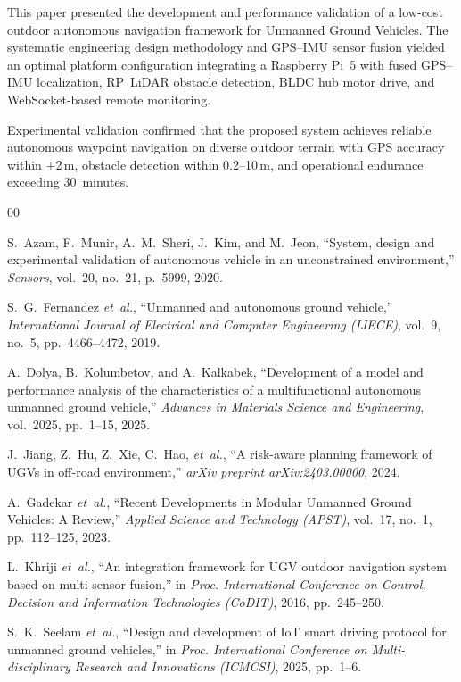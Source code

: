 \documentclass[conference]{IEEEtran}
\begin{document}
This paper presented the development and performance validation of a low-cost outdoor autonomous navigation framework for Unmanned Ground Vehicles. The systematic engineering design methodology and GPS--IMU sensor fusion yielded an optimal platform configuration integrating a Raspberry Pi~5 with fused GPS--IMU localization, RP~LiDAR obstacle detection, BLDC hub motor drive, and WebSocket-based remote monitoring.

Experimental validation confirmed that the proposed system achieves reliable autonomous waypoint navigation on diverse outdoor terrain with GPS accuracy within $\pm$2\,m, obstacle detection within 0.2--10\,m, and operational endurance exceeding 30~minutes.

\begin{thebibliography}{00}

S.~Azam, F.~Munir, A.~M.~Sheri, J.~Kim, and M.~Jeon, ``System, design and experimental validation of autonomous vehicle in an unconstrained environment,'' \textit{Sensors}, vol.~20, no.~21, p.~5999, 2020.

S.~G.~Fernandez \textit{et~al.}, ``Unmanned and autonomous ground vehicle,'' \textit{International Journal of Electrical and Computer Engineering (IJECE)}, vol.~9, no.~5, pp.~4466--4472, 2019.

A.~Dolya, B.~Kolumbetov, and A.~Kalkabek, ``Development of a model and performance analysis of the characteristics of a multifunctional autonomous unmanned ground vehicle,'' \textit{Advances in Materials Science and Engineering}, vol.~2025, pp.~1--15, 2025.

J.~Jiang, Z.~Hu, Z.~Xie, C.~Hao, \textit{et~al.}, ``A risk-aware planning framework of UGVs in off-road environment,'' \textit{arXiv preprint arXiv:2403.00000}, 2024.

A.~Gadekar \textit{et~al.}, ``Recent Developments in Modular Unmanned Ground Vehicles: A Review,'' \textit{Applied Science and Technology (APST)}, vol.~17, no.~1, pp.~112--125, 2023.

L.~Khriji \textit{et~al.}, ``An integration framework for UGV outdoor navigation system based on multi-sensor fusion,'' in \textit{Proc. International Conference on Control, Decision and Information Technologies (CoDIT)}, 2016, pp.~245--250.

S.~K.~Seelam \textit{et~al.}, ``Design and development of IoT smart driving protocol for unmanned ground vehicles,'' in \textit{Proc. International Conference on Multi-disciplinary Research and Innovations (ICMCSI)}, 2025, pp.~1--6.


\end{thebibliography}
\end{document}
